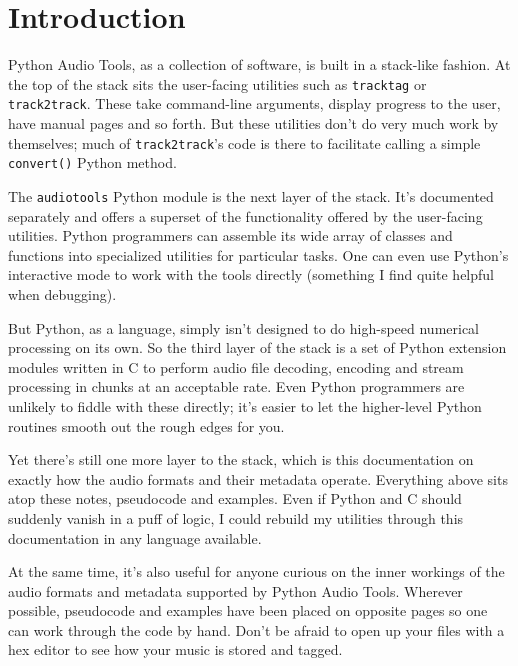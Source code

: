 \chapter{Introduction}
Python Audio Tools, as a collection of software,
is built in a stack-like fashion.
At the top of the stack sits the user-facing utilities
such as \texttt{tracktag} or \texttt{track2track}.
These take command-line arguments, display progress to the user,
have manual pages and so forth.
But these utilities don't do very much work by themselves;
much of \texttt{track2track}'s code is there to facilitate
calling a simple \texttt{convert()} Python method.

The \texttt{audiotools} Python module is the next layer of the stack.
It's documented separately and offers a superset of the functionality
offered by the user-facing utilities.
Python programmers can assemble its wide array of classes
and functions into specialized utilities for particular tasks.
One can even use Python's interactive mode to work with
the tools directly (something I find quite helpful when debugging).

But Python, as a language, simply isn't designed to do
high-speed numerical processing on its own.
So the third layer of the stack is a set of Python extension
modules written in C to perform audio file decoding, encoding
and stream processing in chunks at an acceptable rate.
Even Python programmers are unlikely to fiddle with these
directly; it's easier to let the higher-level Python routines
smooth out the rough edges for you.

Yet there's still one more layer to the stack,
which is this documentation on exactly how the
audio formats and their metadata operate.
Everything above sits atop these notes, pseudocode and examples.
Even if Python and C should suddenly vanish in a puff of logic,
I could rebuild my utilities through this documentation
in any language available.

At the same time, it's also useful for anyone curious
on the inner workings of the audio formats and metadata
supported by Python Audio Tools.
Wherever possible, pseudocode and examples have been
placed on opposite pages so one can work through the code
by hand.
Don't be afraid to open up your files with a hex editor
to see how your music is stored and tagged.
